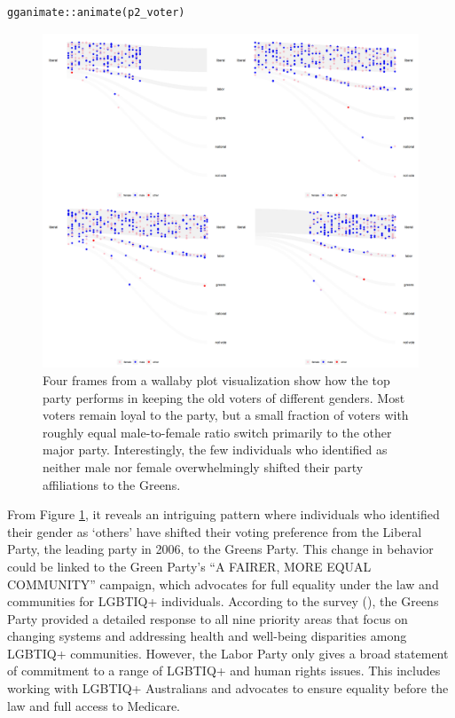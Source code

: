 \begin{verbatim}
gganimate::animate(p2_voter)
\end{verbatim}

\begin{figure}

{\centering \includegraphics[width=1\linewidth]{figures/animation-voter} 

}

\caption{Four frames from a wallaby plot visualization show how the top party performs in keeping the old voters of different genders. Most voters remain loyal to the party, but a small fraction of voters with roughly equal male-to-female ratio switch primarily to the other major party. Interestingly, the few individuals who identified as neither male nor female overwhelmingly shifted their party affiliations to the Greens.}\label{fig:voter-figure}
\end{figure}

From Figure \ref{fig:voter-figure}, it reveals an intriguing pattern where individuals who identified their gender as `others' have shifted their voting preference from the Liberal Party, the leading party in 2006, to the Greens Party. This change in behavior could be linked to the Green Party's ``A FAIRER, MORE EQUAL COMMUNITY'' campaign, which advocates for full equality under the law and communities for LGBTIQ+ individuals. According to the survey (\citet{lgbtiq}), the Greens Party provided a detailed response to all nine priority areas that focus on changing systems and addressing health and well-being disparities among LGBTIQ+ communities. However, the Labor Party only gives a broad statement of commitment to a range of LGBTIQ+ and human rights issues. This includes working with LGBTIQ+ Australians and advocates to ensure equality before the law and full access to Medicare.


